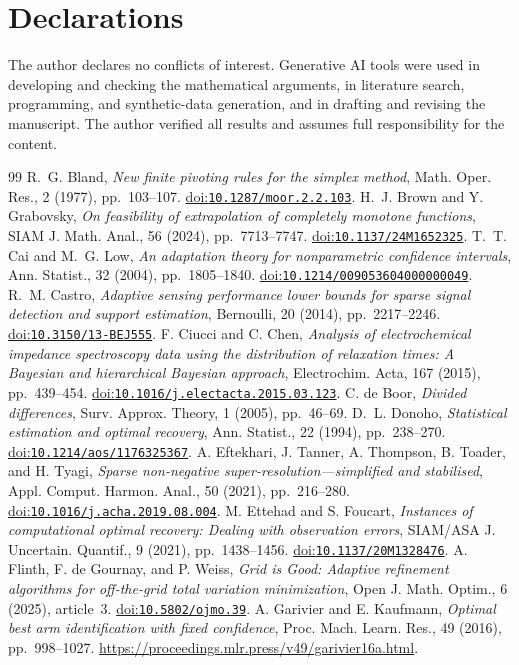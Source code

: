 \documentclass[10pt]{amsart}
\theoremstyle{definition}
\theoremstyle{remark}
\theoremstyle{plain}
\newcommand{\doi}[1]{\href{https://doi.org/#1}{doi:\nolinkurl{#1}}}
\begin{document}
\section*{Declarations}
The author declares no conflicts of interest. Generative AI tools were used in developing and checking the mathematical arguments, in literature search, programming, and synthetic-data generation, and in drafting and revising the manuscript. The author verified all results and assumes full responsibility for the content.
\begin{thebibliography}{99}
 R.~G. Bland, \emph{New finite pivoting rules for the simplex method}, Math. Oper. Res., 2 (1977), pp.~103--107. \doi{10.1287/moor.2.2.103}.
 H.~J. Brown and Y. Grabovsky, \emph{On feasibility of extrapolation of completely monotone functions}, SIAM J. Math. Anal., 56 (2024), pp.~7713--7747. \doi{10.1137/24M1652325}.
 T.~T. Cai and M.~G. Low, \emph{An adaptation theory for nonparametric confidence intervals}, Ann. Statist., 32 (2004), pp.~1805--1840. \doi{10.1214/009053604000000049}.
 R.~M. Castro, \emph{Adaptive sensing performance lower bounds for sparse signal detection and support estimation}, Bernoulli, 20 (2014), pp.~2217--2246. \doi{10.3150/13-BEJ555}.
 F. Ciucci and C. Chen, \emph{Analysis of electrochemical impedance spectroscopy data using the distribution of relaxation times: A Bayesian and hierarchical Bayesian approach}, Electrochim. Acta, 167 (2015), pp.~439--454. \doi{10.1016/j.electacta.2015.03.123}.
 C. de Boor, \emph{Divided differences}, Surv. Approx. Theory, 1 (2005), pp.~46--69.
 D.~L. Donoho, \emph{Statistical estimation and optimal recovery}, Ann. Statist., 22 (1994), pp.~238--270. \doi{10.1214/aos/1176325367}.
 A. Eftekhari, J. Tanner, A. Thompson, B. Toader, and H. Tyagi, \emph{Sparse non-negative super-resolution---simplified and stabilised}, Appl. Comput. Harmon. Anal., 50 (2021), pp.~216--280. \doi{10.1016/j.acha.2019.08.004}.
 M. Ettehad and S. Foucart, \emph{Instances of computational optimal recovery: Dealing with observation errors}, SIAM/ASA J. Uncertain. Quantif., 9 (2021), pp.~1438--1456. \doi{10.1137/20M1328476}.
 A. Flinth, F. de Gournay, and P. Weiss, \emph{Grid is Good: Adaptive refinement algorithms for off-the-grid total variation minimization}, Open J. Math. Optim., 6 (2025), article~3. \doi{10.5802/ojmo.39}.
 A. Garivier and E. Kaufmann, \emph{Optimal best arm identification with fixed confidence}, Proc. Mach. Learn. Res., 49 (2016), pp.~998--1027. \url{https://proceedings.mlr.press/v49/garivier16a.html}.

\end{thebibliography}
\end{document}
